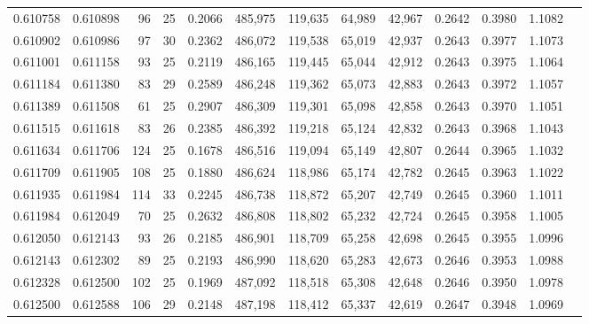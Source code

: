 \begin{tabular}{rrrrrrrrrrrrr}
0.610758 & 0.610898 &     96 &    25 &                                     0.2066 & 485,975 & 119,635 &  64,989 &  42,967 & 0.2642 & 0.3980 & 1.1082 \\
0.610902 & 0.610986 &     97 &    30 &                                     0.2362 & 486,072 & 119,538 &  65,019 &  42,937 & 0.2643 & 0.3977 & 1.1073 \\
0.611001 & 0.611158 &     93 &    25 &                                     0.2119 & 486,165 & 119,445 &  65,044 &  42,912 & 0.2643 & 0.3975 & 1.1064 \\
0.611184 & 0.611380 &     83 &    29 &                                     0.2589 & 486,248 & 119,362 &  65,073 &  42,883 & 0.2643 & 0.3972 & 1.1057 \\
0.611389 & 0.611508 &     61 &    25 &                                     0.2907 & 486,309 & 119,301 &  65,098 &  42,858 & 0.2643 & 0.3970 & 1.1051 \\
0.611515 & 0.611618 &     83 &    26 &                                     0.2385 & 486,392 & 119,218 &  65,124 &  42,832 & 0.2643 & 0.3968 & 1.1043 \\
0.611634 & 0.611706 &    124 &    25 &                                     0.1678 & 486,516 & 119,094 &  65,149 &  42,807 & 0.2644 & 0.3965 & 1.1032 \\
0.611709 & 0.611905 &    108 &    25 &                                     0.1880 & 486,624 & 118,986 &  65,174 &  42,782 & 0.2645 & 0.3963 & 1.1022 \\
0.611935 & 0.611984 &    114 &    33 &                                     0.2245 & 486,738 & 118,872 &  65,207 &  42,749 & 0.2645 & 0.3960 & 1.1011 \\
0.611984 & 0.612049 &     70 &    25 &                                     0.2632 & 486,808 & 118,802 &  65,232 &  42,724 & 0.2645 & 0.3958 & 1.1005 \\
0.612050 & 0.612143 &     93 &    26 &                                     0.2185 & 486,901 & 118,709 &  65,258 &  42,698 & 0.2645 & 0.3955 & 1.0996 \\
0.612143 & 0.612302 &     89 &    25 &                                     0.2193 & 486,990 & 118,620 &  65,283 &  42,673 & 0.2646 & 0.3953 & 1.0988 \\
0.612328 & 0.612500 &    102 &    25 &                                     0.1969 & 487,092 & 118,518 &  65,308 &  42,648 & 0.2646 & 0.3950 & 1.0978 \\
0.612500 & 0.612588 &    106 &    29 &                                     0.2148 & 487,198 & 118,412 &  65,337 &  42,619 & 0.2647 & 0.3948 & 1.0969 \\

\end{tabular}
